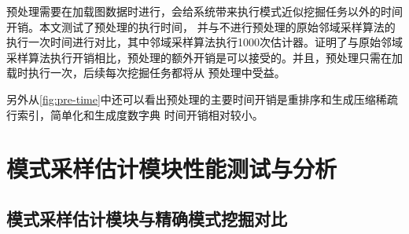 \documentclass[master]{thesis-uestc}
\begin{document}
    预处理需要在加载图数据时进行，会给系统带来执行模式近似挖掘任务以外的时间开销。本文测试了预处理的执行时间，
并与不进行预处理的原始邻域采样算法的执行一次时间进行对比，其中邻域采样算法执行1000次估计器。证明了与原始邻域
采样算法执行开销相比，预处理的额外开销是可以接受的。并且，预处理只需在加载时执行一次，后续每次挖掘任务都将从
预处理中受益。

    另外从\ref{fig:pre-time}中还可以看出预处理的主要时间开销是重排序和生成压缩稀疏行索引，简单化和生成度数字典
时间开销相对较小。

\section{模式采样估计模块性能测试与分析}
\label{sec-sampling-exp}

\subsection{模式采样估计模块与精确模式挖掘对比}
\label{subsec:sampling-cmp-accurate}
\end{document}

